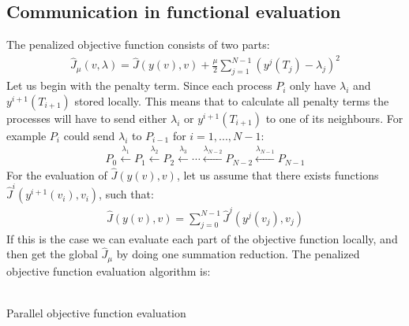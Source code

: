 \subsection{Communication in functional evaluation}
The penalized objective function consists of two parts:
\begin{align*}
\hat J_{\mu}(v,\lambda) = \hat{J}(y(v),v) + \frac{\mu}{2}\sum_{j=1}^{N-1}(y^{j}(T_j)-\lambda_j)^2
\end{align*}
Let us begin with the penalty term. Since each process $P_i$ only have $\lambda_i$ and $y^{i+1}(T_{i+1})$ stored locally. This means that to calculate all penalty terms the processes will have to send either $\lambda_i$ or $y^{i+1}(T_{i+1})$ to one of its neighbours. For example $P_i$ could send $\lambda_i$ to $P_{i-1}$ for $i=1,...,N-1$:
\begin{align*}
P_0\overset{\lambda_1}{\longleftarrow}P_1\overset{\lambda_2}{\longleftarrow}P_2 \overset{\lambda_3}{\longleftarrow}\cdots \overset{\lambda_{N-2}}{\longleftarrow}P_{N-2}\overset{\lambda_{N-1}}{\longleftarrow}P_{N-1}
\end{align*} 
For the evaluation of $ \hat{J}(y(v),v)$, let us assume that there exists functions $\hat{J}^i(y^{i+1}(v_i),v_i)$, such that:
\begin{align*}
\hat{J}(y(v),v)= \sum_{j=0}^{N-1}\hat{J}^j(y^j(v_j),v_j)
\end{align*}
If this is the case we can evaluate each part of the objective function locally, and then get the global $\hat{J}_{\mu}$ by doing one summation reduction. The penalized objective function evaluation algorithm is:
\\
\\
\begin{algorithm}[H]
\caption{Parallel objective function evaluation}
\end{algorithm}
